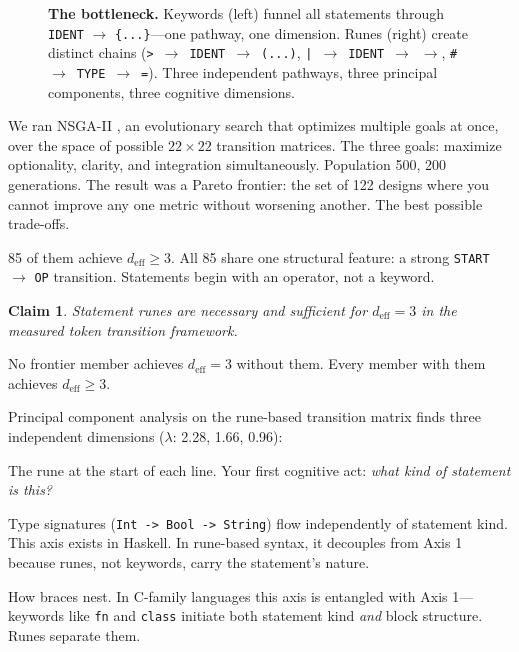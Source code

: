 \documentclass[11pt,a4paper]{article}
\newtheorem{claim}{Claim}
\newcommand{\deff}{d_{\mathrm{eff}}}
\begin{document}
\begin{figure}[H]
\caption{\textbf{The bottleneck.} Keywords (left) funnel all statements through \texttt{IDENT} $\to$ \texttt{\{...\}}---one pathway, one dimension. Runes (right) create distinct chains (\texttt{>}~$\to$~\texttt{IDENT}~$\to$~\texttt{(...)}, \texttt{|}~$\to$~\texttt{IDENT}~$\to$~$\rightarrow$, \texttt{\#}~$\to$~\texttt{TYPE}~$\to$~\texttt{=}). Three independent pathways, three principal components, three cognitive dimensions.}
\label{fig:bottleneck}
\end{figure}

We ran NSGA-II \cite{Deb2002}, an evolutionary search that optimizes multiple goals at once, over the space of possible $22 \times 22$ transition matrices. The three goals: maximize optionality, clarity, and integration simultaneously. Population 500, 200 generations. The result was a Pareto frontier: the set of 122 designs where you cannot improve any one metric without worsening another. The best possible trade-offs.

85 of them achieve $\deff \geq 3$. All 85 share one structural feature: a strong \texttt{START} $\to$ \texttt{OP} transition. Statements begin with an operator, not a keyword.

\begin{claim}
Statement runes are necessary and sufficient for $\deff = 3$ in the measured token transition framework.
\end{claim}

No frontier member achieves $\deff = 3$ without them. Every member with them achieves $\deff \geq 3$.

Principal component analysis on the rune-based transition matrix finds three independent dimensions ($\lambda$: 2.28, 1.66, 0.96):

\begin{description}[nosep]
\item[Axis 1 --- Statement kind ($\lambda = 2.28$).] The rune at the start of each line. Your first cognitive act: \emph{what kind of statement is this?}

\item[Axis 2 --- Type flow ($\lambda = 1.66$).] Type signatures (\texttt{Int -> Bool -> String}) flow independently of statement kind. This axis exists in Haskell. In rune-based syntax, it decouples from Axis 1 because runes, not keywords, carry the statement's nature.

\item[Axis 3 --- Block composition ($\lambda = 0.96$).] How braces nest. In C-family languages this axis is entangled with Axis 1---keywords like \texttt{fn} and \texttt{class} initiate both statement kind \emph{and} block structure. Runes separate them.
\end{description}
\end{document}
